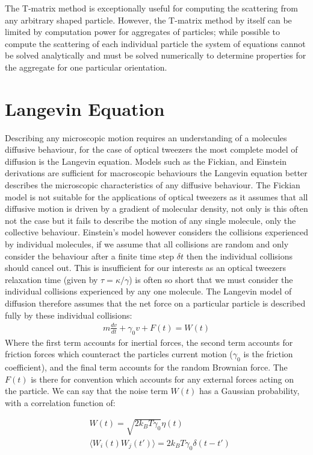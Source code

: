 \documentclass[a4paper,oneside,11pt]{book}
\begin{document}
The T-matrix method is exceptionally useful for computing the scattering from any arbitrary shaped particle. However, the T-matrix method by itself can be limited by computation power for aggregates of particles; while possible to compute the scattering of each individual particle the system of equations cannot be solved analytically and must be solved numerically to determine properties for the aggregate for one particular orientation. 

\section{Langevin Equation}
Describing any microscopic motion requires an understanding of a molecules diffusive behaviour, for the case of optical tweezers the most complete model of diffusion is the Langevin equation. Models such as the Fickian, and Einstein derivations are sufficient for macroscopic behaviours the Langevin equation better describes the microscopic characteristics of any diffusive behaviour. The Fickian model is not suitable for the applications of optical tweezers as it assumes that all diffusive motion is driven by a gradient of molecular density, not only is this often not the case but it fails to describe the motion of any single molecule, only the collective behaviour. Einstein's model however considers the collisions experienced by individual molecules, if we assume that all collisions are random and only consider the behaviour after a finite time step $\delta t$ then the individual collisions should cancel out. This is insufficient for our interests as an optical tweezers relaxation time (given by $\tau = \kappa/\gamma$) is often so short that we must consider the individual collisions experienced by any one molecule. The Langevin model of diffusion therefore assumes that the net force on a particular particle is described fully by these individual collisions:
\begin{align}
	m\frac{dv}{dt} + \gamma_0 v + F(t) = W(t)
\end{align}
Where the first term accounts for inertial forces, the second term accounts for friction forces which counteract the particles current motion ($\gamma_0$ is the friction coefficient), and the final term accounts for the random Brownian force. The $F(t)$ is there for convention which accounts for any external forces acting on the particle. We can say that the noise term $W(t)$ has a Gaussian probability, with a correlation function of:

\begin{align}
	&W(t) = \sqrt{2k_BT\gamma_0}\eta(t) \\
	&\langle W_i(t)W_j(t')\rangle = 2k_BT\gamma_0\delta(t-t')
\end{align}
\end{document}
